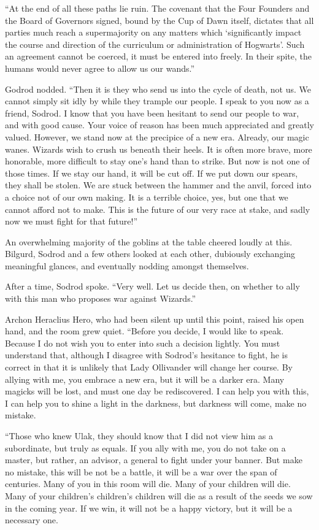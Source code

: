 “At the end of all these paths lie ruin. The covenant that the Four Founders and the Board of Governors signed, bound by the Cup of Dawn itself, dictates that all parties much reach a supermajority on any matters which ‘significantly impact the course and direction of the curriculum or administration of Hogwarts’. Such an agreement cannot be coerced, it must be entered into freely. In their spite, the humans would never agree to allow us our wands.”

Godrod nodded. “Then it is they who send us into the cycle of death, not us. We cannot simply sit idly by while they trample our people. I speak to you now as a friend, Sodrod. I know that you have been hesitant to send our people to war, and with good cause. Your voice of reason has been much appreciated and greatly valued. However, we stand now at the precipice of a new era. Already, our magic wanes. Wizards wish to crush us beneath their heels. It is often more brave, more honorable, more difficult to stay one’s hand than to strike. But now is not one of those times. If we stay our hand, it will be cut off. If we put down our spears, they shall be stolen. We are stuck between the hammer and the anvil, forced into a choice not of our own making. It is a terrible choice, yes, but one that we cannot afford not to make. This is the future of our very race at stake, and sadly now we must fight for that future!”

An overwhelming majority of the goblins at the table cheered loudly at this. Bilgurd, Sodrod and a few others looked at each other, dubiously exchanging meaningful glances, and eventually nodding amongst themselves.

After a time, Sodrod spoke. “Very well. Let us decide then, on whether to ally with this man who proposes war against Wizards.”

Archon Heraclius Hero, who had been silent up until this point, raised his open hand, and the room grew quiet. “Before you decide, I would like to speak. Because I do not wish you to enter into such a decision lightly. You must understand that, although I disagree with Sodrod’s hesitance to fight, he is correct in that it is unlikely that Lady Ollivander will change her course. By allying with me, you embrace a new era, but it will be a darker era. Many magicks will be lost, and must one day be rediscovered. I can help you with this, I can help you to shine a light in the darkness, but darkness will come, make no mistake.

“Those who knew Ulak, they should know that I did not view him as a subordinate, but truly as equals. If you ally with me, you do not take on a master, but rather, an advisor, a general to fight under your banner. But make no mistake, this will be not be a battle, it will be a war over the span of centuries. Many of you in this room will die. Many of your children will die. Many of your children’s children’s children will die as a result of the seeds we sow in the coming year. If we win, it will not be a happy victory, but it will be a necessary one.

